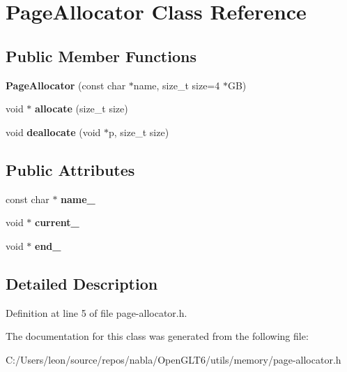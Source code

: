\hypertarget{class_page_allocator}{}\section{Page\+Allocator Class Reference}
\label{class_page_allocator}
\subsection*{Public Member Functions}
\begin{DoxyCompactItemize}
\item 
\mbox{\label{class_page_allocator_a4a17992fdc7a59fa9bbc01d38a9dd553}} 
{\bfseries Page\+Allocator} (const char $\ast$name, size\+\_\+t size=4 $\ast$GB)
\item 
\mbox{\label{class_page_allocator_aace2770352e13422515c4fa2dbdadd50}} 
void $\ast$ {\bfseries allocate} (size\+\_\+t size)
\item 
\mbox{\label{class_page_allocator_ae3c05b01e61a8b5d3d18bde2a16dc7ab}} 
void {\bfseries deallocate} (void $\ast$p, size\+\_\+t size)
\end{DoxyCompactItemize}
\subsection*{Public Attributes}
\begin{DoxyCompactItemize}
\item 
\mbox{\label{class_page_allocator_a7a7310605c23e3cfb79a76f80c8fd340}} 
const char $\ast$ {\bfseries name\+\_\+}
\item 
\mbox{\label{class_page_allocator_a312706b7610cb7c5eca8f31fa79d1cf7}} 
void $\ast$ {\bfseries current\+\_\+}
\item 
\mbox{\label{class_page_allocator_a9bdba46b98f1df0649f44f5ba8c98289}} 
void $\ast$ {\bfseries end\+\_\+}
\end{DoxyCompactItemize}


\subsection{Detailed Description}


Definition at line 5 of file page-\/allocator.\+h.



The documentation for this class was generated from the following file\+:\begin{DoxyCompactItemize}
\item 
C\+:/\+Users/leon/source/repos/nabla/\+Open\+G\+L\+T6/utils/memory/page-\/allocator.\+h\end{DoxyCompactItemize}

